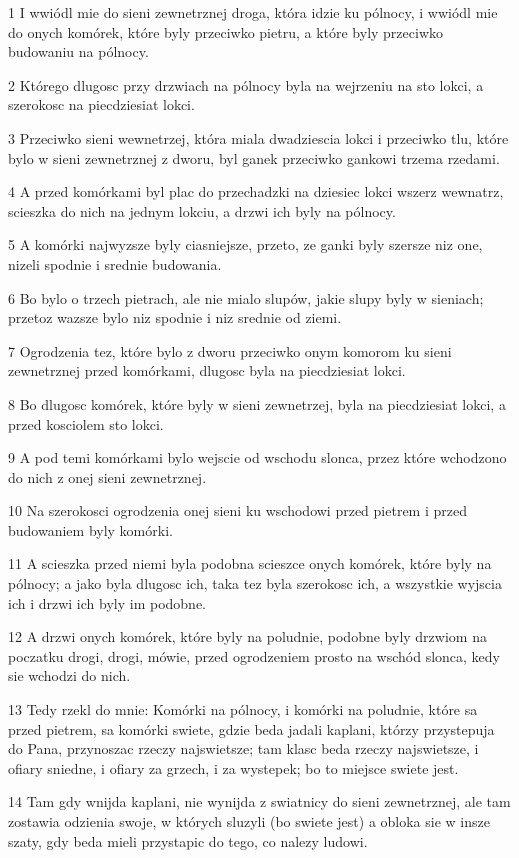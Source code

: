 \par 1 I wwiódl mie do sieni zewnetrznej droga, która idzie ku pólnocy, i wwiódl mie do onych komórek, które byly przeciwko pietru, a które byly przeciwko budowaniu na pólnocy.
\par 2 Którego dlugosc przy drzwiach na pólnocy byla na wejrzeniu na sto lokci, a szerokosc na piecdziesiat lokci.
\par 3 Przeciwko sieni wewnetrzej, która miala dwadziescia lokci i przeciwko tlu, które bylo w sieni zewnetrznej z dworu, byl ganek przeciwko gankowi trzema rzedami.
\par 4 A przed komórkami byl plac do przechadzki na dziesiec lokci wszerz wewnatrz, scieszka do nich na jednym lokciu, a drzwi ich byly na pólnocy.
\par 5 A komórki najwyzsze byly ciasniejsze, przeto, ze ganki byly szersze niz one, nizeli spodnie i srednie budowania.
\par 6 Bo bylo o trzech pietrach, ale nie mialo slupów, jakie slupy byly w sieniach; przetoz wazsze bylo niz spodnie i niz srednie od ziemi.
\par 7 Ogrodzenia tez, które bylo z dworu przeciwko onym komorom ku sieni zewnetrznej przed komórkami, dlugosc byla na piecdziesiat lokci.
\par 8 Bo dlugosc komórek, które byly w sieni zewnetrzej, byla na piecdziesiat lokci, a przed kosciolem sto lokci.
\par 9 A pod temi komórkami bylo wejscie od wschodu slonca, przez które wchodzono do nich z onej sieni zewnetrznej.
\par 10 Na szerokosci ogrodzenia onej sieni ku wschodowi przed pietrem i przed budowaniem byly komórki.
\par 11 A scieszka przed niemi byla podobna scieszce onych komórek, które byly na pólnocy; a jako byla dlugosc ich, taka tez byla szerokosc ich, a wszystkie wyjscia ich i drzwi ich byly im podobne.
\par 12 A drzwi onych komórek, które byly na poludnie, podobne byly drzwiom na poczatku drogi, drogi, mówie, przed ogrodzeniem prosto na wschód slonca, kedy sie wchodzi do nich.
\par 13 Tedy rzekl do mnie: Komórki na pólnocy, i komórki na poludnie, które sa przed pietrem, sa komórki swiete, gdzie beda jadali kaplani, którzy przystepuja do Pana, przynoszac rzeczy najswietsze; tam klasc beda rzeczy najswietsze, i ofiary sniedne, i ofiary za grzech, i za wystepek; bo to miejsce swiete jest.
\par 14 Tam gdy wnijda kaplani, nie wynijda z swiatnicy do sieni zewnetrznej, ale tam zostawia odzienia swoje, w których sluzyli (bo swiete jest) a obloka sie w insze szaty, gdy beda mieli przystapic do tego, co nalezy ludowi.

